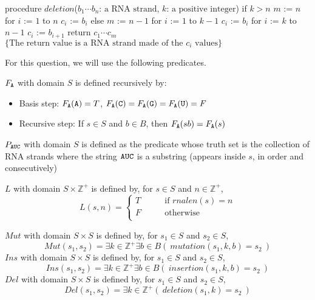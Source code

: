 \documentclass[12pt, oneside]{article}
\begin{document}
\begin{enumerate}
\begin{algorithm}
procedure $\textit{deletion}$($b_1\cdots b_n$: $\textrm{a RNA strand}$, $k$: $\textrm{a  positive integer}$)
if $k > n$
  $m$ := $n$
  for $i$ := $1$ to $n$
    $c_i$ := $b_i$
else
  $m$ := $n-1$
  for $i$ := $1$ to $k-1$ 
    $c_i$ := $b_i$
  for $i$ := $k$ to $n-1$
    $c_i$ := $b_{i+1}$
return $c_1\cdots c_m$ $\{ \textrm{The return value is a RNA strand made of the } c_i \textrm{ values}\}$
\end{algorithm}

For this question, we will use the following predicates.

$F_{\texttt{A}}$ with domain $S$ is defined recursively by: 
\begin{itemize}
\item[]Basis step: $F_{\texttt{A}}(\texttt{A}) = T$, $F_{\texttt{A}}(\texttt{C}) = F_{\texttt{A}}(\texttt{G}) = F_{\texttt{A}}(\texttt{U}) = F$
\item[]Recursive step: If $s \in S$ and $b \in B$, then $F_{\texttt{A}}(sb) = F_{\texttt{A}}(s)$
\end{itemize}

$P_{\texttt{A}\texttt{U}\texttt{C}}$ with domain $S$ is defined as the predicate whose truth set
is the collection of RNA strands where the string $\texttt{A}\texttt{U}\texttt{C}$
is a substring (appears inside $s$, in order and consecutively)

$L$ with domain $S \times \mathbb{Z}^+$ is defined by, for $s \in S$ and $n \in \mathbb{Z}^+$,
\[
L( s, n) = \begin{cases}
T &\qquad\text{if $rnalen(s) = n$}\\
F &\qquad\text{otherwise}\\
\end{cases}
\]

$Mut$ with domain $S \times S$ is defined by, for $s_1 \in S$ and $s_2 \in S$,
\[
Mut(s_1,s_2) = \exists k\in \mathbb{Z^+} \exists b \in B (~ mutation(s_1, k, b) = s_2~)
\]
$Ins$ with domain $S \times S$ is defined by, for $s_1 \in S$ and $s_2 \in S$,
\[
Ins(s_1,s_2) = \exists k\in \mathbb{Z^+} \exists b \in B (~ insertion(s_1, k, b) = s_2~)
\]
$Del$ with domain $S \times S$ is defined by, for $s_1 \in S$ and $s_2 \in S$,
\[
Del(s_1,s_2) = \exists k\in \mathbb{Z^+} (~ deletion(s_1, k) = s_2~)
\]


\end{enumerate}
\end{document}

